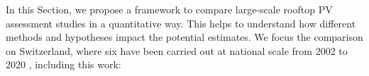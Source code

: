 In this Section, we propose a framework to compare large-scale rooftop PV assessment studies in a quantitative way. This helps to understand how different methods and hypotheses impact the potential estimates. We focus the comparison on Switzerland, where six have been carried out at national scale from 2002 to 2020 \cite{iea_potential_2002,assouline_quantifying_2017,assouline_large-scale_2018,klauser_solarpotentialanalyse_2016,buffat_scalable_2018, walch_big_2020}
, including this work:

